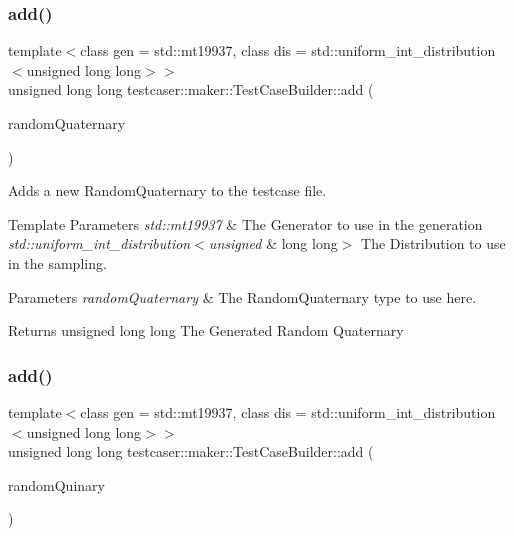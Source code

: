 \subsubsection{\texorpdfstring{add()}{add()}\hspace{0.1cm}{\footnotesize\ttfamily [7/11]}}
{\footnotesize\ttfamily template$<$class gen  = std\+::mt19937, class dis  = std\+::uniform\+\_\+int\+\_\+distribution$<$unsigned long long$>$$>$ \\
unsigned long long testcaser\+::maker\+::\+Test\+Case\+Builder\+::add (\begin{DoxyParamCaption}\item[{\mbox{\hyperlink{structtestcaser_1_1maker_1_1types_1_1RandomQuaternary}{types\+::\+Random\+Quaternary}}$<$ gen, dis $>$ \&}]{random\+Quaternary }\end{DoxyParamCaption})\hspace{0.3cm}{\ttfamily [inline]}}



Adds a new Random\+Quaternary to the testcase file. 


\begin{DoxyTemplParams}{Template Parameters}
{\em std\+::mt19937} & The Generator to use in the generation \\
\hline
{\em std\+::uniform\+\_\+int\+\_\+distribution$<$unsigned} & long long$>$ The Distribution to use in the sampling. \\
\hline
\end{DoxyTemplParams}

\begin{DoxyParams}{Parameters}
{\em random\+Quaternary} & The Random\+Quaternary type to use here. \\
\hline
\end{DoxyParams}
\begin{DoxyReturn}{Returns}
unsigned long long The Generated Random Quaternary 
\end{DoxyReturn}
\mbox{\label{classtestcaser_1_1maker_1_1TestCaseBuilder_a8c036fe574ac265ebbe37225727047e6}} 
\subsubsection{\texorpdfstring{add()}{add()}\hspace{0.1cm}{\footnotesize\ttfamily [8/11]}}
{\footnotesize\ttfamily template$<$class gen  = std\+::mt19937, class dis  = std\+::uniform\+\_\+int\+\_\+distribution$<$unsigned long long$>$$>$ \\
unsigned long long testcaser\+::maker\+::\+Test\+Case\+Builder\+::add (\begin{DoxyParamCaption}\item[{\mbox{\hyperlink{structtestcaser_1_1maker_1_1types_1_1RandomQuinary}{types\+::\+Random\+Quinary}}$<$ gen, dis $>$ \&}]{random\+Quinary }\end{DoxyParamCaption})\hspace{0.3cm}{\ttfamily [inline]}}



